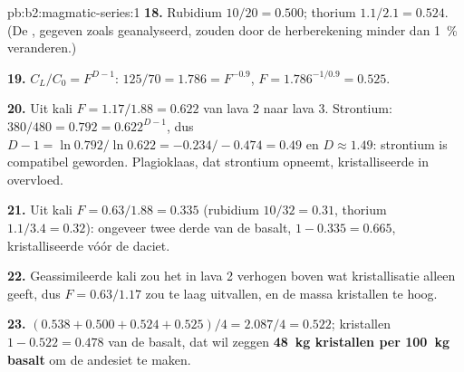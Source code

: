 \begin{solution}{pb:b2:magmatic-series:1}
\textbf{18.} Rubidium $10/20 = 0.500$; thorium $1.1/2.1 = 0.524$. (De
, gegeven zoals geanalyseerd, zouden door de herberekening minder dan \qty{1}{\percent}
veranderen.)

\textbf{19.} $C_L/C_0 = F^{D - 1}$: $125/70 = 1.786 = F^{-0.9}$, $F = 1.786^{-1/0.9} =
0.525$.

\textbf{20.} Uit kali $F = 1.17/1.88 = 0.622$ van lava 2 naar lava 3. Strontium:
$380/480 = 0.792 = 0.622^{D - 1}$, dus $D - 1 = \ln 0.792/\ln 0.622 = -0.234/-0.474 =
0.49$ en $D \approx 1.49$: strontium is compatibel geworden. Plagioklaas, dat
strontium opneemt, kristalliseerde in overvloed.

\textbf{21.} Uit kali $F = 0.63/1.88 = 0.335$ (rubidium $10/32 = 0.31$, thorium
$1.1/3.4 = 0.32$): ongeveer twee derde van de basalt, $1 - 0.335 = 0.665$, kristalliseerde
vóór de daciet.

\textbf{22.} Geassimileerde kali zou het  in lava 2 verhogen boven wat
kristallisatie alleen geeft, dus $F = 0.63/1.17$ zou te laag uitvallen, en de massa
kristallen te hoog.

\textbf{23.} $(0.538 + 0.500 + 0.524 + 0.525)/4 = 2.087/4 = 0.522$; kristallen $1 - 0.522
= 0.478$ van de basalt, dat wil zeggen \textbf{\qty[text-series-to-math=true]{48}{kg}
kristallen per \qty{100}{kg} basalt} om de andesiet te maken.
\end{solution}
